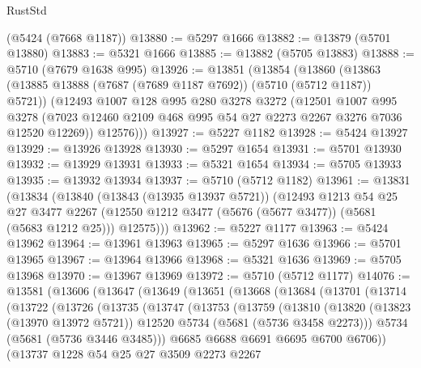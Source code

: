 \begin{lexlean}{RustStd}
\begin{coremodule}
    (@5424 (@7668 @1187))
@13880 := @5297 @1666
@13882 := @13879 (@5701 @13880)
@13883 := @5321 @1666
@13885 := @13882 (@5705 @13883)
@13888 := @5710 (@7679 @1638 @995)
@13926 := @13851
    (@13854
      (@13860
        (@13863 (@13885 @13888 (@7687 (@7689 @1187 @7692)) (@5710 (@5712 @1187)) @5721))
        (@12493
          @1007
          @128
          @995
          @280
          @3278
          @3272
          (@12501
            @1007
            @995
            @3278
            (@7023 @12460 @2109 @468 @995 @54 @27 @2273 @2267 @3276 @7036 @12520 @12269))
          @12576)))
@13927 := @5227 @1182
@13928 := @5424 @13927
@13929 := @13926 @13928
@13930 := @5297 @1654
@13931 := @5701 @13930
@13932 := @13929 @13931
@13933 := @5321 @1654
@13934 := @5705 @13933
@13935 := @13932 @13934
@13937 := @5710 (@5712 @1182)
@13961 := @13831
    (@13834
      (@13840
        (@13843 (@13935 @13937 @5721))
        (@12493
          @1213
          @54
          @25
          @27
          @3477
          @2267
          (@12550 @1212 @3477 (@5676 (@5677 @3477)) (@5681 (@5683 @1212 @25)))
          @12575)))
@13962 := @5227 @1177
@13963 := @5424 @13962
@13964 := @13961 @13963
@13965 := @5297 @1636
@13966 := @5701 @13965
@13967 := @13964 @13966
@13968 := @5321 @1636
@13969 := @5705 @13968
@13970 := @13967 @13969
@13972 := @5710 (@5712 @1177)
@14076 := @13581
    (@13606
      (@13647
        (@13649
          (@13651
            (@13668
              (@13684
                (@13701
                  (@13714
                    (@13722
                      (@13726
                        (@13735
                          (@13747
                            (@13753
                              (@13759
                                (@13810
                                  (@13820
                                    (@13823 (@13970 @13972 @5721))
                                    @12520
                                    @5734
                                    (@5681 (@5736 @3458 @2273)))
                                  @5734
                                  (@5681 (@5736 @3446 @3485)))
                                @6685
                                @6688
                                @6691
                                @6695
                                @6700
                                @6706))
                            (@13737
                              @1228
                              @54
                              @25
                              @27
                              @3509
                              @2273
                              @2267

\end{coremodule}
\end{lexlean}
